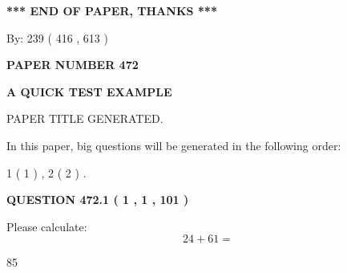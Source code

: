 \documentclass[12pt]{article}
\begin{document}
   
   
   
\vspace{1.0in} 
{\textbf{\large{ *** END OF PAPER, THANKS *** }}} 
   
   
\hspace{1.0in} By: 
 239 ( 416 ,  613 )
   
   
   
   
\newpage 
\setcounter{page}{ 
   472001 } 
   
   
   
   
 {\textbf{ \Large{ PAPER NUMBER  472  }}}
   
   
\vspace{0.2in}
   
   
   
   
   
   
   
   
 \vspace{0.2in}
{\LARGE {\textbf{ A QUICK TEST EXAMPLE}}}
   
   
 PAPER TITLE GENERATED.
   
   
   
\vspace{0.2in}
   
In this paper, big questions will be generated in the following order: 
   
   
   1 ( 1 )
 ,
   2 ( 2 )
 .
  
\vspace{0.2in}
  
{\textbf{\Large{QUESTION
472.1 
 ( 1 , 1 , 101 )
}}}
  
  
 
Please calculate:
\begin{equation}
24 +  %
61 = \nonumber
\end{equation}
 
 
 
\noindent{}
 
 

85
 
 
\noindent{}
 
 

 
 
 
\noindent{}
 
\end{document}
